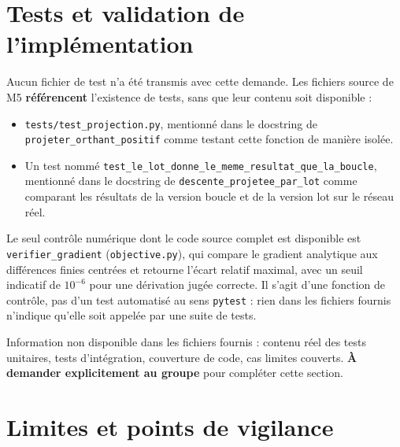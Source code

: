 \documentclass[11pt,a4paper]{article}
\begin{document}
\section{Tests et validation de l'implémentation}

Aucun fichier de test n'a été transmis avec cette demande. Les fichiers
source de M5 \textbf{référencent} l'existence de tests, sans que leur
contenu soit disponible :

\begin{itemize}
  \item \texttt{tests/test\_projection.py}, mentionné dans le docstring de
  \texttt{projeter\_orthant\_positif} comme testant cette fonction de
  manière isolée.
  \item Un test nommé
  \texttt{test\_le\_lot\_donne\_le\_meme\_resultat\_que\_la\_boucle},
  mentionné dans le docstring de \texttt{descente\_projetee\_par\_lot} comme
  comparant les résultats de la version boucle et de la version lot sur le
  réseau réel.
\end{itemize}

Le seul contrôle numérique dont le code source complet est disponible est
\texttt{verifier\_gradient} (\texttt{objective.py}), qui compare le gradient
analytique aux différences finies centrées et retourne l'écart relatif
maximal, avec un seuil indicatif de $10^{-6}$ pour une dérivation jugée
correcte. Il s'agit d'une fonction de contrôle, pas d'un test automatisé au
sens \texttt{pytest} : rien dans les fichiers fournis n'indique qu'elle soit
appelée par une suite de tests.

Information non disponible dans les fichiers fournis : contenu réel des
tests unitaires, tests d'intégration, couverture de code, cas limites
couverts. \textbf{À demander explicitement au groupe} pour compléter cette
section.

\section{Limites et points de vigilance}
\end{document}
